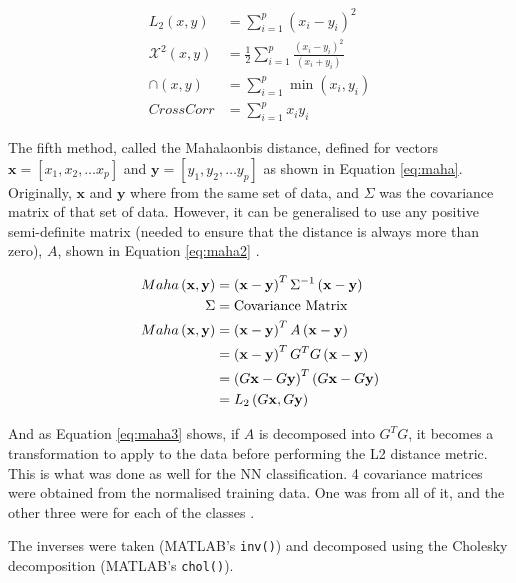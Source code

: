 \documentclass[a4paper, 10pt, conference]{ieeeconf}
\begin{document}
\begin{align}
  L_2 \left( x, y \right) &= \sum_{i = 1}^{p} \left( x_i  - y_i \right) ^2 \label{eq:l22}\\
  \mathcal{X}^2 \left( x, y \right) &= \frac{1}{2} \sum_{i = 1}^{p} \frac{\left( x_i - y_i \right) ^2 }{\left( x_i + y_i \right)} \label{eq:chi}\\
  \cap \left( x, y \right) &= \sum_{i = 1}^{p} \min \left( x_i, y_i \right) \label{eq:intersection}\\
  CrossCorr &= \sum_{i = 1}^{p} x_i y_i \label{eq:corr}
\end{align}

The fifth method, called the Mahalaonbis distance, defined for vectors $\mathbf{x} = [x_1, x_2, \ldots x_p]$ and $\mathbf{y} = [y_1, y_2, \ldots y_p]$ as shown in Equation \ref{eq:maha}. Originally, $\mathbf{x}$ and $\mathbf{y}$ where from the same set of data, and $\Sigma$ was the covariance matrix of that set of data. However, it can be generalised to use any positive semi-definite matrix (needed to ensure that the distance is always more than zero), $A$, shown in Equation \ref{eq:maha2} \cite{metrics}.

\begin{align}
  Maha \left( \mathbf{x}, \mathbf{y} \right) &= \left( \mathbf{x} - \mathbf{y} \right) ^T \Sigma^{-1} \left( \mathbf{x} - \mathbf{y} \right)\label{eq:maha}\\
  \Sigma &= \text{Covariance Matrix}\notag\\
  Maha \left( \mathbf{x}, \mathbf{y} \right)&= \left( \mathbf{x} - \mathbf{y} \right) ^T A \left( \mathbf{x} - \mathbf{y}\right)\label{eq:maha2}\\
  &= \left( \mathbf{x} - \mathbf{y} \right) ^T G^T G \left( \mathbf{x} - \mathbf{y}\right)\notag\\
  &= \left( G\mathbf{x} - G\mathbf{y} \right) ^T \left( G\mathbf{x} - G\mathbf{y}\right)\notag\\
  &= L_2\left( G\mathbf{x}, G\mathbf{y} \right) \label{eq:maha3}
\end{align}

And as Equation \ref{eq:maha3} shows, if $A$ is decomposed into $G^TG$, it becomes a transformation to apply to the data before performing the L2 distance metric. This is what was done as well for the NN classification. 4 covariance matrices were obtained from the normalised training data. One was from all of it, and the other three were for each of the classes \cite{metrics}.

The inverses were taken (MATLAB's \texttt{inv()}) and decomposed using the Cholesky decomposition (MATLAB's \texttt{chol()}).
\end{document}
